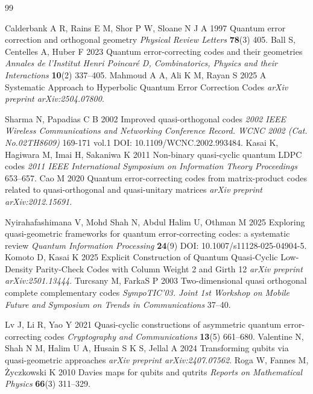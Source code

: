 \documentclass{iopjournal}
\theoremstyle{thmstyleone}%
\theoremstyle{thmstyletwo}%
\theoremstyle{thmstylethree}%
\begin{document}
\begin{thebibliography}{99}

Calderbank A R, Rains E M, Shor P W, Sloane N J A 1997 Quantum error correction and orthogonal geometry \emph{Physical Review Letters} \textbf{78}(3) 405.
Ball S, Centelles A, Huber F 2023 Quantum error-correcting codes and their geometries \emph{Annales de l’Institut Henri Poincaré D, Combinatorics, Physics and their Interactions} \textbf{10}(2) 337–405.
Mahmoud A A, Ali K M, Rayan S 2025 A Systematic Approach to Hyperbolic Quantum Error Correction Codes \emph{arXiv preprint arXiv:2504.07800}.

Sharma N, Papadias C B 2002 Improved quasi-orthogonal codes \emph{2002 IEEE Wireless Communications and Networking Conference Record. WCNC 2002 (Cat. No.02TH8609)} 169-171 vol.1 DOI: 10.1109/WCNC.2002.993484.
Kasai K, Hagiwara M, Imai H, Sakaniwa K 2011 Non-binary quasi-cyclic quantum LDPC codes \emph{2011 IEEE International Symposium on Information Theory Proceedings} 653–657.
Cao M 2020 Quantum error-correcting codes from matrix-product codes related to quasi-orthogonal and quasi-unitary matrices \emph{arXiv preprint arXiv:2012.15691}.

Nyirahafashimana V, Mohd Shah N, Abdul Halim U, Othman M 2025 Exploring quasi-geometric frameworks for quantum error-correcting codes: a systematic review \emph{Quantum Information Processing} \textbf{24}(9) DOI: 10.1007/s11128-025-04904-5.
Komoto D, Kasai K 2025 Explicit Construction of Quantum Quasi-Cyclic Low-Density Parity-Check Codes with Column Weight 2 and Girth 12 \emph{arXiv preprint arXiv:2501.13444}.
Turcsany M, FarkaS P 2003 Two-dimensional quasi orthogonal complete complementary codes \emph{SympoTIC'03. Joint 1st Workshop on Mobile Future and Symposium on Trends in Communications} 37–40.

Lv J, Li R, Yao Y 2021 Quasi-cyclic constructions of asymmetric quantum error-correcting codes \emph{Cryptography and Communications} \textbf{13}(5) 661–680.
Valentine N, Shah N M, Halim U A, Husain S K S, Jellal A 2024 Transforming qubits via quasi-geometric approaches \emph{arXiv preprint arXiv:2407.07562}.
Roga W, Fannes M, {\.Z}yczkowski K 2010 Davies maps for qubits and qutrits \emph{Reports on Mathematical Physics} \textbf{66}(3) 311–329.


\end{thebibliography}
\end{document}
